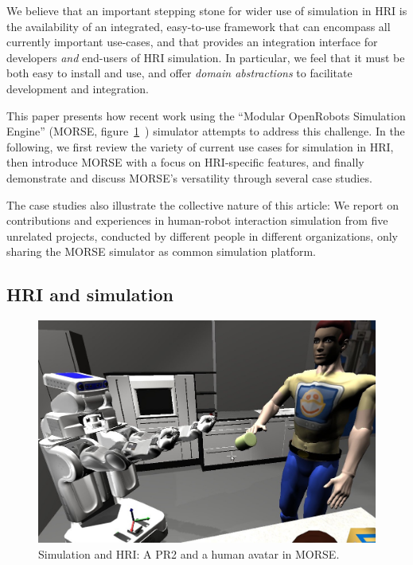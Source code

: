 \documentclass{llncs}
\begin{document}
We believe that an important stepping stone for wider use of simulation in HRI
is the availability of an integrated, easy-to-use framework that can encompass
all currently important use-cases, and that provides an integration interface 
for developers \emph{and} end-users of HRI simulation.  In particular, we feel
that it must be both easy to install and use, and offer \emph{domain 
abstractions} to facilitate development and integration.

This paper presents how recent work using the ``Modular OpenRobots Simulation
Engine'' (MORSE, figure~\ref{fig|morse-hri}~\cite{morse_simpar_2012}) simulator
attempts to address this challenge. In the following, we first review the variety of 
current use cases for simulation in HRI, then introduce MORSE with a focus on 
HRI-specific features, and finally demonstrate and discuss MORSE's versatility
through several case studies. 

The case studies also illustrate the collective nature
of this article: We report on contributions and experiences in human-robot interaction
simulation from five unrelated projects, conducted by different people in
different organizations, only sharing the MORSE simulator
as common simulation platform. 


\subsection*{HRI and simulation}

\begin{figure}[t]
      \centering 
      \includegraphics[width=0.7\linewidth]{morse_pr2.jpg}
      \caption{Simulation and HRI: A PR2 and a human avatar in MORSE.}
      \label{fig|morse-hri}
\end{figure}
\end{document}
